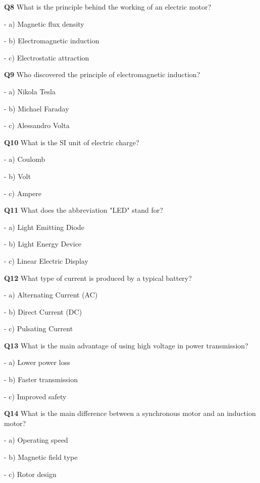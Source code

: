 \textbf{Q8} What is the principle behind the working of an electric motor?\par
\quad - a) Magnetic flux density\par
\quad - b) Electromagnetic induction\par
\quad - c) Electrostatic attraction\par

\textbf{Q9} Who discovered the principle of electromagnetic induction?\par
\quad - a) Nikola Tesla\par
\quad - b) Michael Faraday\par
\quad - c) Alessandro Volta\par

\textbf{Q10} What is the SI unit of electric charge?\par
\quad - a) Coulomb\par
\quad - b) Volt\par
\quad - c) Ampere\par

\textbf{Q11} What does the abbreviation "LED" stand for?\par
\quad - a) Light Emitting Diode\par
\quad - b) Light Energy Device\par
\quad - c) Linear Electric Display\par

\textbf{Q12} What type of current is produced by a typical battery?\par
\quad - a) Alternating Current (AC)\par
\quad - b) Direct Current (DC)\par
\quad - c) Pulsating Current\par

\textbf{Q13} What is the main advantage of using high voltage in power transmission?\par
\quad - a) Lower power loss\par
\quad - b) Faster transmission\par
\quad - c) Improved safety\par

\textbf{Q14} What is the main difference between a synchronous motor and an induction motor?\par
\quad - a) Operating speed\par
\quad - b) Magnetic field type\par
\quad - c) Rotor design\par


